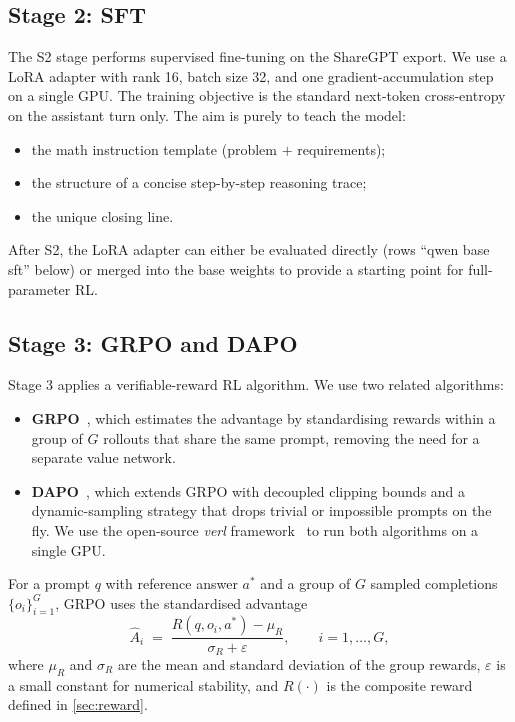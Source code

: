 \subsection{Stage 2: SFT}
The S2 stage performs supervised fine-tuning on the
 ShareGPT export. We use a LoRA adapter with rank 16,
batch size 32, and one gradient-accumulation step on a single GPU. The
training objective is the standard next-token cross-entropy on the
assistant turn only. The aim is purely to teach the model:

\begin{itemize}
  \item the math instruction template (problem $+$ requirements);
  \item the structure of a concise step-by-step reasoning trace;
  \item the unique  closing line.
\end{itemize}

After S2, the LoRA adapter can either be evaluated directly (rows ``qwen
base sft'' below) or merged into the base weights to provide a starting
point for full-parameter RL.

\subsection{Stage 3: GRPO and DAPO}
Stage 3 applies a verifiable-reward RL algorithm. We use two related
algorithms:

\begin{itemize}
  \item \textbf{GRPO}~\cite{deepseekmath}, which estimates the advantage by
    standardising rewards within a group of $G$ rollouts that share the
    same prompt, removing the need for a separate value network.
  \item \textbf{DAPO}~\cite{dapo}, which extends GRPO with decoupled
    clipping bounds and a dynamic-sampling strategy that drops trivial or
    impossible prompts on the fly. We use the open-source \emph{verl}
    framework~\cite{verl} to run both algorithms on a single GPU.
\end{itemize}

For a prompt $q$ with reference answer $a^{*}$ and a group of $G$ sampled
completions $\{o_i\}_{i=1}^{G}$, GRPO uses the standardised advantage
\begin{equation}
\hat A_i \;=\; \frac{R(q, o_i, a^{*}) - \mu_R}{\sigma_R + \varepsilon},
\qquad i = 1,\dots,G,
\label{eq:advantage}
\end{equation}
where $\mu_R$ and $\sigma_R$ are the mean and standard deviation of the
group rewards, $\varepsilon$ is a small constant for numerical stability,
and $R(\cdot)$ is the composite reward defined in \cref{sec:reward}.

